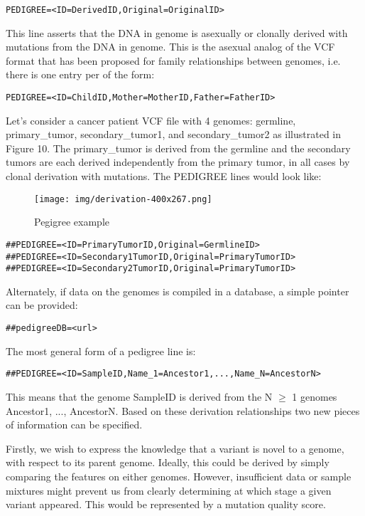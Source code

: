 \documentclass[8pt]{article}
\begin{document}
\begin{verbatim}
PEDIGREE=<ID=DerivedID,Original=OriginalID>
\end{verbatim}

This line asserts that the DNA in genome is asexually or clonally derived with mutations from the DNA in genome. This is the asexual analog of the VCF format that has been proposed for family relationships between genomes, i.e. there is one entry per of the form:

\begin{verbatim}
PEDIGREE=<ID=ChildID,Mother=MotherID,Father=FatherID>
\end{verbatim}

Let's consider a cancer patient VCF file with 4 genomes: germline, primary\_tumor, secondary\_tumor1, and secondary\_tumor2 as illustrated in Figure 10. The primary\_tumor is derived from the germline and the secondary tumors are each derived independently from the primary tumor, in all cases by clonal derivation with mutations. The PEDIGREE lines would look like:

\begin{figure}[ht]
\centering
\texttt{[image: img/derivation-400x267.png]}
\caption{Pegigree example}
\end{figure}

\begin{verbatim}
##PEDIGREE=<ID=PrimaryTumorID,Original=GermlineID>
##PEDIGREE=<ID=Secondary1TumorID,Original=PrimaryTumorID>
##PEDIGREE=<ID=Secondary2TumorID,Original=PrimaryTumorID>
\end{verbatim}

Alternately, if data on the genomes is compiled in a database, a simple pointer can be provided:

\begin{verbatim}
##pedigreeDB=<url>
\end{verbatim}

The most general form of a pedigree line is:

\begin{verbatim}
##PEDIGREE=<ID=SampleID,Name_1=Ancestor1,...,Name_N=AncestorN>
\end{verbatim}

This means that the genome SampleID is derived from the N $\ge$ 1 genomes Ancestor1, ..., AncestorN. Based on these derivation relationships two new pieces of information can be specified.

Firstly, we wish to express the knowledge that a variant is novel to a genome, with respect to its parent genome. Ideally, this could be derived by simply comparing the features on either genomes. However, insufficient data or sample mixtures might prevent us from clearly determining at which stage a given variant appeared. This would be represented by a mutation quality score.
\end{document}
